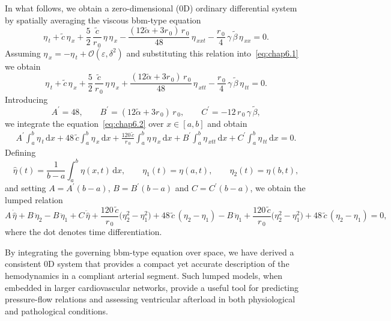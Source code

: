 \documentclass[alpha-refs, 12pt]{wiley-article}
\renewcommand{\O}{\mathcal{O}}
\newcommand{\ud}{\mathrm{d}}
\newcommand{\eps}{\varepsilon}
\begin{document}
In what follows, we obtain a zero-dimensional (0D) ordinary differential system by spatially averaging the viscous \acrshort{bbm}-type equation
\begin{equation}\label{eq:chap6.1}
  \eta_{\,t}
  +\tilde{c}\,\eta_{\,x}
  +\frac{5}{2}\,\frac{\tilde{c}}{r_{\,0}}\,\eta\,\eta_{\,x}
  -\frac{(12\tilde{\alpha}+3r_{\,0})\,r_{\,0}}{48}\,\eta_{\,xxt}
  -\frac{r_{\,0}}{4}\,\gamma\,\tilde{\beta}\,\eta_{\,xx}=0.
\end{equation}
Assuming
\(\eta_{\,x}=-\eta_{\,t} + \O(\eps,\delta^{2})\) and substituting this
relation into~\eqref{eq:chap6.1} we obtain
\begin{equation}\label{eq:chap6.2}
  \eta_{\,t}
  +\tilde{c}\,\eta_{\,x}
  +\frac{5}{2}\,\frac{\tilde{c}}{r_{\,0}}\,\eta\,\eta_{\,x}
  +\frac{(12\tilde{\alpha}+3r_{\,0})\,r_{\,0}}{48}\,\eta_{\,xtt}
  -\frac{r_{\,0}}{4}\,\gamma\,\tilde{\beta}\,\eta_{\,tt}=0.
\end{equation}
Introducing
\[
  A^{\prime}=48,\qquad
  B^{\prime}=(12\tilde{\alpha}+3r_{\,0})\,r_{\,0},\qquad
  C^{\prime}=-12\,r_{\,0}\,\gamma\,\tilde{\beta},
\]
we integrate the equation~\eqref{eq:chap6.2} over \(x\in[a,b]\) and obtain
\begin{multline}\label{eq:chap6.4}
  A^{\prime}\int_{a}^{b}\eta_{\,t}\,\ud x
  +48\,\tilde{c}\int_{a}^{b}\eta_{\,x}\,\ud x
  +\frac{120\,\tilde{c}}{r_{\,0}}\int_{a}^{b}\eta\,\eta_{\,x}\,\ud x
  +B^{\prime}\int_{a}^{b}\eta_{\,xtt}\,\ud x
  +C^{\prime}\int_{a}^{b}\eta_{\,tt}\,\ud x=0.
\end{multline}
Defining
\[
  \hat{\eta}(t)=\frac{1}{b-a}\int_{a}^{b}\eta(x,t)\,\ud x,\qquad
  \eta_{1}(t)=\eta(a,t),\qquad
  \eta_{2}(t)=\eta(b,t),
\]
and setting
\(A=A^{\prime}(b-a)\), \(B=B^{\prime}(b-a)\) and
\(C=C^{\prime}(b-a)\), we obtain the lumped relation
\begin{equation}\label{eq:chap6.5}
  A\,\dot{\hat{\eta}}
  +B\,\ddot{\eta}_{2}
  -B\,\ddot{\eta}_{1}
  +C\,\ddot{\hat{\eta}}
  +\frac{120\,\tilde{c}}{r_{\,0}}\bigl(\eta_{2}^{2}-\eta_{1}^{2}\bigr)
  +48\,\tilde{c}\,(\eta_{2}-\eta_{1})
  -B\,\ddot{\eta}_{1}
  +\frac{120\,\tilde{c}}{r_{\,0}}\bigl(\eta_{2}^{2}-\eta_{1}^{2}\bigr)
  +48\,\tilde{c}\,(\eta_{2}-\eta_{1})=0,
\end{equation}
where the dot denotes time differentiation.

By integrating the governing \acrshort{bbm}-type equation over space, we have derived a consistent 0D system that provides a compact yet accurate description of the hemodynamics in a compliant arterial segment. Such lumped models, when embedded in larger cardiovascular networks, provide a useful tool for predicting pressure-flow relations and assessing ventricular afterload in both physiological and pathological conditions.
\end{document}
